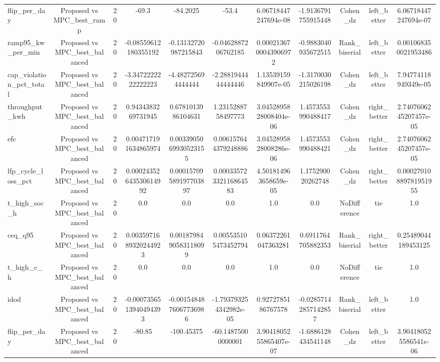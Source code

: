 \begin{table}[t]
\begin{tabular}{lcccccccccc}
flip\_per\_day & Proposed vs MPC\_best\_ramp & 20 & -69.3 & -84.2025 & -53.4 & 6.06718447247694e-08 & -1.9136791755915448 & Cohen\_dz & left\_better & 6.06718447247694e-07 \\
ramp95\_kw\_per\_min & Proposed vs MPC\_best\_balanced & 20 & -0.08559612180355192 & -0.13132720987215843 & -0.0462887206762185 & 0.0002136700043906972 & -0.9883040935672515 & Rank\_biserial & left\_better & 0.001068350021953486 \\
cap\_violation\_pct\_total & Proposed vs MPC\_best\_balanced & 20 & -3.3472222222222223 & -4.482725694444444 & -2.2881944444444446 & 1.13539159849907e-05 & -1.3170030215026198 & Cohen\_dz & left\_better & 7.94774118949349e-05 \\
throughput\_kwh & Proposed vs MPC\_best\_balanced & 20 & 0.9434383269731945 & 0.6781013986104631 & 1.2315288758497773 & 3.0452895828008404e-06 & 1.4573553990488417 & Cohen\_dz & right\_better & 2.7407606245207457e-05 \\
efc & Proposed vs MPC\_best\_balanced & 20 & 0.004717191634865974 & 0.0033905069930523155 & 0.006157644379248886 & 3.0452895828008286e-06 & 1.4573553990488421 & Cohen\_dz & right\_better & 2.7407606245207457e-05 \\
lfp\_cycle\_loss\_pct & Proposed vs MPC\_best\_balanced & 20 & 0.00024352643530614992 & 0.00015709589197703897 & 0.00033572332116864583 & 4.501814963658659e-05 & 1.175290020262748 & Cohen\_dz & right\_better & 0.00027010889781951955 \\
t\_high\_soc\_h & Proposed vs MPC\_best\_balanced & 20 & 0.0 & 0.0 & 0.0 & 1.0 & 0.0 & NoDifference & tie & 1.0 \\
ceq\_q95 & Proposed vs MPC\_best\_balanced & 20 & 0.0035971689320244923 & 0.0018798490583118099 & 0.005535105473452794 & 0.06372261047363281 & 0.6911764705882353 & Rank\_biserial & right\_better & 0.25489044189453125 \\
t\_high\_c\_h & Proposed vs MPC\_best\_balanced & 20 & 0.0 & 0.0 & 0.0 & 1.0 & 0.0 & NoDifference & tie & 1.0 \\
idod & Proposed vs MPC\_best\_balanced & 20 & -0.0007356513940494393 & -0.0015484876067736986 & -1.793793254342982e-05 & 0.9272785186767578 & -0.02857142857142857 & Rank\_biserial & left\_better & 1.0 \\
flip\_per\_day & Proposed vs MPC\_best\_balanced & 20 & -80.85 & -100.45375 & -60.14875000000001 & 3.9041805255865407e-07 & -1.6886128434541148 & Cohen\_dz & left\_better & 3.904180525586541e-06 \\
\bottomrule
\end{tabular}
\end{table}

